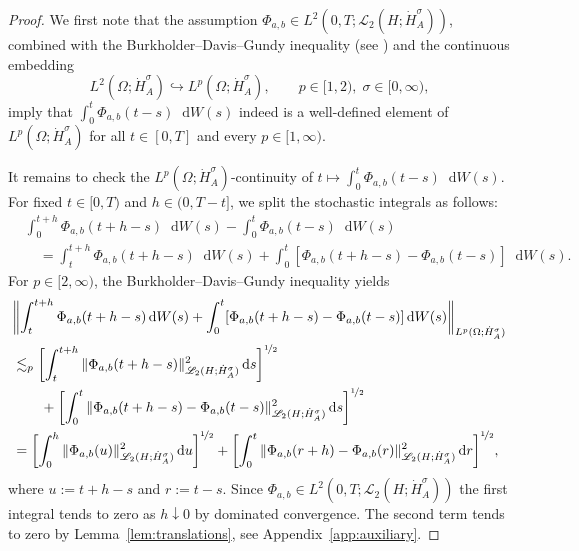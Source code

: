 \documentclass[reqno]{amsart}
\numberwithin{equation}{section}
\newcommand{\norm}[2]{     \| #1       \|_{ #2 }}
\newcommand{\rd}{\mathop{}\!\mathrm{d}}
\newcommand{\Hdot}[1]{\dot{H}^{#1}_A}
\theoremstyle{remark}
\theoremstyle{definition}
\begin{document}
\begin{proof} 
	We first note that 
	the assumption 
	$\Phi_{a,b} \in L^2(0,T;\mathscr L_2(H;\dot{H}^\sigma_A))$, 
	combined with the 
	Burkholder--Davis--Gundy inequality 
	(see \cite[Theorem~6.1.2]{LiuRockner2015})
	and the continuous embedding 
	\begin{equation}\label{eq:Lp-embedding} 
	L^2(\Omega;\Hdot{\sigma}) \hookrightarrow 
	L^p(\Omega;\Hdot{\sigma}), 
	\qquad 
	p\in[1,2), \; 
	\sigma\in[0,\infty),
	\end{equation} 
	imply that 
	$\int_0^t \Phi_{a,b}(t-s)\rd W(s)$ 
	indeed is a well-defined element 
	of $L^p(\Omega;\dot H_A^\sigma)$ 
	for all $t\in [0,T]$ 
	and every $p\in[1,\infty)$.  
	
	It remains to check the $L^p(\Omega; \Hdot{\sigma})$-continuity 
	of $t \mapsto \int_0^t \Phi_{a,b}(t-s)\rd W(s)$. 
	For fixed $t \in [0,T)$ and $h \in (0, T-t]$, we split the 
	stochastic integrals as follows:
	\begin{align*} 
	&\int_0^{t+h} \Phi_{a,b}(t+h-s)\rd W(s) - \int_0^t \Phi_{a,b}(t-s)\rd W(s) 
	\\
	&\quad 
	= 
	\int_t^{t+h} \Phi_{a,b}(t+h-s) \rd W(s) 
	+ 
	\int_0^{t} [\Phi_{a,b}(t+h-s) - \Phi_{a,b}(t-s)] \rd W(s). 
	\end{align*}
	For $p \in [2,\infty)$, the Burkholder--Davis--Gundy inequality yields 
	\begin{align*} 
	&\biggl\| 
	\int_t^{t+h} \Phi_{a,b}(t+h-s) \rd W(s) 
	+ \int_0^{t} [\Phi_{a,b}(t+h-s) - \Phi_{a,b}(t-s)] \rd W(s) 
	\biggr\|_{L^p(\Omega;\Hdot\sigma)} 
	\\
	&\lesssim_p 
	\biggl[\int_t^{t+h} \norm{\Phi_{a,b}(t+h-s)}{
		\mathscr L_2(H;\dot H_A^\sigma)}^2 \rd s 
	\biggr]^{\nicefrac{1}{2}}  
	\\
	&\qquad + 
	\biggl[ \int_0^t 
	\norm{ \Phi_{a,b}(t+h-s) - \Phi_{a,b}(t-s) }{ 
		\mathscr L_2(H;\dot H_A^\sigma)}^2 \rd s 
	\biggr]^{\nicefrac{1}{2}} 
	\\
	&= 
	\biggl[ \int_0^h 
	\norm{\Phi_{a,b}(u)}{\mathscr L_2(H;\dot H_A^\sigma)}^2 \rd u 
	\biggr]^{\nicefrac{1}{2}} 
	+ 
	\biggl[ \int_0^t 
	\norm{\Phi_{a,b}(r+h) - \Phi_{a,b}(r)}{ 
		\mathscr L_2(H;\dot H_A^\sigma)}^2 \rd r 
	\biggr]^{\nicefrac{1}{2}}, 
	\end{align*} 
	where $u := t+h-s$ and $r := t-s$.
	Since $\Phi_{a,b}\in L^2(0,T;\mathscr L_2(H;\dot H_A^\sigma))$ 
	the first integral tends to zero as $h \downarrow 0$ 
	by dominated convergence. 
	The second term tends to zero by Lemma~\ref{lem:translations}, 
	see Appendix~\ref{app:auxiliary}. 
	

\end{proof}
\end{document}

